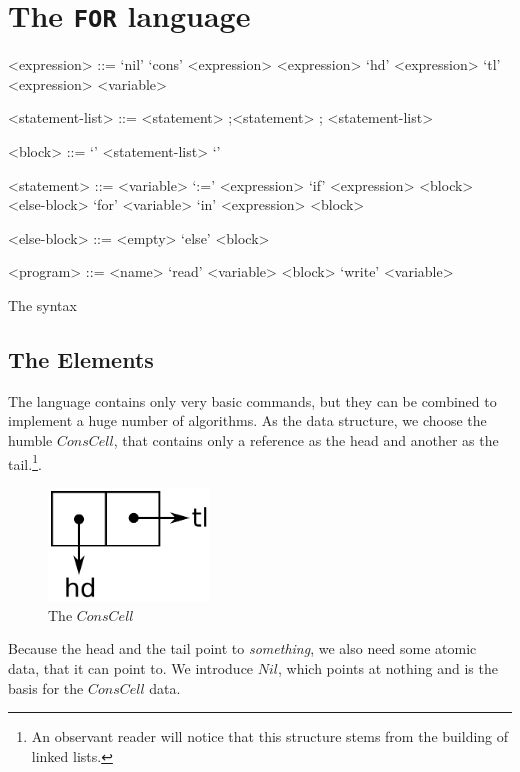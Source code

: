 \section{The {\tt FOR} language}
\label{sec:FOR}
\begin{table}[htb]
	\begin{grammar}
		<expression> ::= 
							`nil' 
				\alt 	`cons' <expression> <expression>
				\alt 	`hd' <expression>
				\alt 	`tl' <expression>
				\alt 	<variable>

		<statement-list> ::= <statement> ;\alt <statement> ; <statement-list>

		<block> ::= `{' <statement-list> `}'

		<statement> ::=
							<variable> `:=' <expression>
				\alt	`if' <expression> <block> <else-block>
				\alt	`for' <variable> `in' <expression> <block>
			
				<else-block> ::= <empty> \alt `else' <block>
				
				<program> ::= <name> `read' <variable> <block> `write' <variable>
	\end{grammar}
	\caption{The \FOR syntax \label{tab:FOR-syntax}}
\end{table}

\subsection{The Elements} %
\label{sub:TheElements}
The \FOR language contains only very basic commands, but they can be combined
to implement a huge number of algorithms. As the data structure, we choose 
the humble $ConsCell$, that contains only a reference as the head and 
another as the tail.\footnote{An observant reader will notice that this
structure stems from the building of linked lists.}.
\begin{figure}[htb]
	\begin{center}
		\includegraphics[height=3cm]{introduction/for/images/conscell}
	\end{center}
	\caption{The $ConsCell$}
\end{figure}

Because the head and the tail point to {\em something}, we also need some 
atomic data, that it can point to. We introduce $Nil$, which points at 
nothing and is the basis for the $ConsCell$ data.

